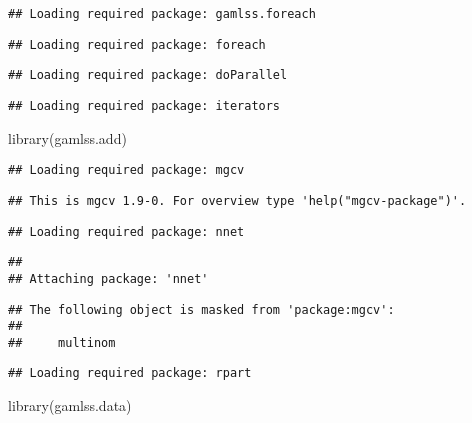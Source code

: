 \documentclass[
]{article}
\newenvironment{Shaded}{\begin{snugshade}}{\end{snugshade}}
\newcommand{\FunctionTok}[1]{\textcolor[rgb]{0.00,0.00,0.00}{#1}}
\newcommand{\NormalTok}[1]{#1}
\begin{document}
\begin{verbatim}
## Loading required package: gamlss.foreach
\end{verbatim}

\begin{verbatim}
## Loading required package: foreach
\end{verbatim}

\begin{verbatim}
## Loading required package: doParallel
\end{verbatim}

\begin{verbatim}
## Loading required package: iterators
\end{verbatim}

\begin{Shaded}
\begin{Highlighting}[]
\FunctionTok{library}\NormalTok{(gamlss.add)}
\end{Highlighting}
\end{Shaded}

\begin{verbatim}
## Loading required package: mgcv
\end{verbatim}

\begin{verbatim}
## This is mgcv 1.9-0. For overview type 'help("mgcv-package")'.
\end{verbatim}

\begin{verbatim}
## Loading required package: nnet
\end{verbatim}

\begin{verbatim}
## 
## Attaching package: 'nnet'
\end{verbatim}

\begin{verbatim}
## The following object is masked from 'package:mgcv':
## 
##     multinom
\end{verbatim}

\begin{verbatim}
## Loading required package: rpart
\end{verbatim}

\begin{Shaded}
\begin{Highlighting}[]
\FunctionTok{library}\NormalTok{(gamlss.data)}
\end{Highlighting}
\end{Shaded}
\end{document}
